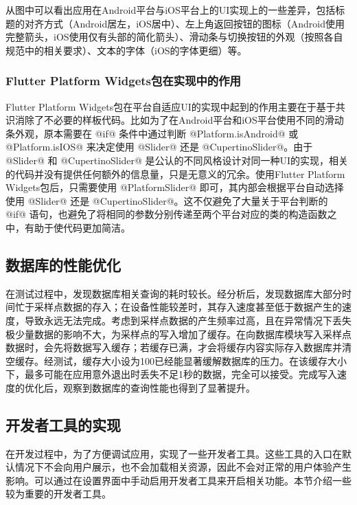 从图中可以看出应用在Android平台与iOS平台上的UI实现上的一些差异，包括标题的对齐方式（Android居左，iOS居中）、左上角返回按钮的图标（Android使用完整箭头，iOS使用仅有头部的简化箭头）、滑动条与切换按钮的外观（按照各自规范中的相关要求）、文本的字体（iOS的字体更细）等。

\subsubsection{Flutter Platform Widgets包在实现中的作用}

Flutter Platform Widgets包在平台自适应UI的实现中起到的作用主要在于基于共识消除了不必要的样板代码。比如为了在Android平台和iOS平台使用不同的滑动条外观，原本需要在 @if@ 条件中通过判断 @Platform.isAndroid@ 或 @Platform.isIOS@ 来决定使用 @Slider@ 还是 @CupertinoSlider@。由于 @Slider@ 和 @CupertinoSlider@ 是公认的不同风格设计对同一种UI的实现，相关的代码并没有提供任何额外的信息量，只是无意义的冗余。使用Flutter Platform Widgets包后，只需要使用 @PlatformSlider@ 即可，其内部会根据平台自动选择使用 @Slider@ 还是 @CupertinoSlider@。这不仅避免了大量关于平台判断的 @if@ 语句，也避免了将相同的参数分别传递至两个平台对应的类的构造函数之中，有助于使代码更加简洁。

\subsection{数据库的性能优化}\label{subsec:db-optimization}

在测试过程中，发现数据库相关查询的耗时较长。经分析后，发现数据库大部分时间忙于采样点数据的存入；在设备性能较差时，其存入速度甚至低于数据产生的速度，导致永远无法完成。考虑到采样点数据的产生频率过高，且在异常情况下丢失极少量数据的影响不大，为采样点的写入增加了缓存。在向数据库模块写入采样点数据时，会先将数据写入缓存；若缓存已满，才会将缓存内容实际存入数据库并清空缓存。经测试，缓存大小设为100已经能显著缓解数据库的压力。在该缓存大小下，最多可能在应用意外退出时丢失不足1秒的数据，完全可以接受。完成写入速度的优化后，观察到数据库的查询性能也得到了显著提升。

\subsection{开发者工具的实现}\label{subsec:dev-tools}

在开发过程中，为了方便调试应用，实现了一些开发者工具。这些工具的入口在默认情况下不会向用户展示，也不会加载相关资源，因此不会对正常的用户体验产生影响。可以通过在设置界面中手动启用开发者工具来开启相关功能。本节介绍一些较为重要的开发者工具。

